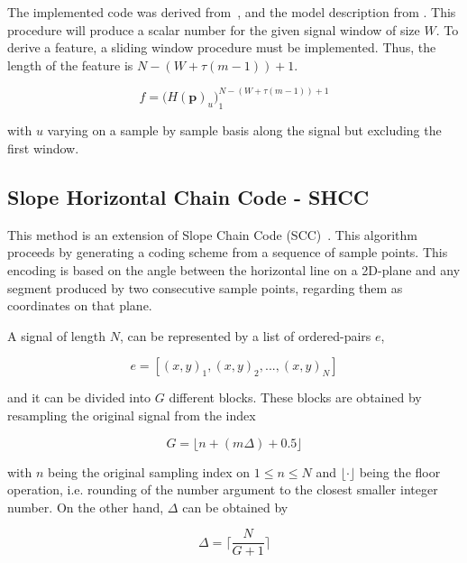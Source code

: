 \documentclass[brainsci,article,submit,moreauthors,pdftex,10pt,a4paper]{mdpi}
\begin{document}
The implemented code was derived from~\citep{Unakafova2013}, and the model description from \citep{Berger2017}.  This procedure will produce a scalar number for the given signal window of size $W$.  To derive a feature, a sliding window procedure must be implemented.  Thus, the length of the feature is $N - (W + \tau (m - 1)) + 1$.

\begin{equation}
f =  {\bigg ( H(\textbf{p})_{u} \bigg )}_{1}^{N - (W + \tau (m - 1)) + 1}
\label{eq:pe6}
\end{equation}

\noindent with $u$ varying on a sample by sample basis along the signal but excluding the first window.

\subsection{Slope Horizontal Chain Code - SHCC}

This method is an extension of Slope Chain Code (SCC)~\citep{Alvarado-Gonzalez2016}. This algorithm proceeds by generating a coding scheme from a sequence of sample points. This encoding is based on the angle between the horizontal line on a 2D-plane and any segment produced by two consecutive sample points, regarding them as coordinates on that plane.  

A signal of length $N$, can be represented by a list of ordered-pairs $e$,

\begin{equation}
e = \left[ (x,y)_{1}, (x,y)_{2}, ..., (x,y)_{N} \right]
\label{eq:shccdelta}
\end{equation}

\noindent and it can be divided into $G$ different blocks.  These blocks are obtained by resampling the original signal from the index 

\begin{equation}
G = \lfloor n + ( m \Delta ) + 0.5 \rfloor
\label{eq:shcc2}
\end{equation}

\noindent with $n$ being the original sampling index on $ 1 \leq n \leq N $ and $\lfloor \cdot \rfloor$ being the floor operation, i.e. rounding of the number argument to the closest smaller integer number.  On the other hand, $\Delta$ can be obtained by

\begin{equation}
\Delta = \bigg \lceil \frac{N}{G+1} \bigg \rceil
\label{eq:shcc3}
\end{equation}
\end{document}
